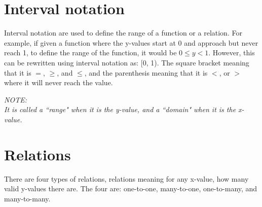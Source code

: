 \documentclass{book}
\newenvironment{note}{\begin{center}\em NOTE:\\}{\end{center}}
\begin{document}
\section{Interval notation}
Interval notation are used to define the range of a function or a relation.  For example, if given a function where the y-values start at 0 and approach but never reach 1, to define the range of the function, it would be $0 \leq y < 1$.  However, this can be rewritten using interval notation as: [0, 1).  The square bracket meaning that it is $=$, $\geq$, and $\leq$, and the parenthesis meaning that it is $<$, or $>$ where it will never reach the value.\\
\begin{note}
	It is called a ``range" when it is the y-value, and a ``domain" when it is the x-value.
\end{note}

\section{Relations}
There are four types of relations, relations meaning for any x-value, how many valid y-values there are.  The four are: one-to-one, many-to-one, one-to-many, and many-to-many.
\end{document}
